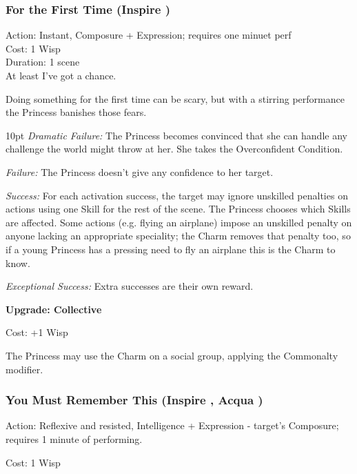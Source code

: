 \subsubsection*{For the First Time (Inspire \textbullet\textbullet)}

\noindent Action: Instant, Composure + Expression; requires one minuet perf\\

\noindent Cost: 1 Wisp\\

\noindent Duration: 1 scene\\

At least I've got a chance.

Doing something for the first time can be scary, but with a stirring performance the Princess banishes those fears. 

\begin{myindentpar}{10pt}
\emph{Dramatic Failure:} The Princess becomes convinced that she can handle any challenge the world might throw at her. She takes the Overconfident Condition.

\emph{Failure:} The Princess doesn’t give any confidence to her target.

\emph{Success:} For each activation success, the target may ignore unskilled penalties on actions using one Skill for the rest of the scene. The Princess chooses which Skills are affected. Some actions (e.g. flying an airplane) impose an unskilled penalty on anyone lacking an appropriate speciality; the Charm removes that penalty too, so if a young Princess has a pressing need to fly an airplane this is the Charm to know.

\emph{Exceptional Success:} Extra successes are their own reward.

\textbf{Upgrade: Collective}

Cost: +1 Wisp

The Princess may use the Charm on a social group, applying the Commonalty modifier.\end{myindentpar}

\subsubsection*{You Must Remember This (Inspire \textbullet\textbullet, Acqua \textbullet)}

\noindent Action: Reflexive and resisted, Intelligence + Expression - target's Composure; requires 1 minute of performing. 

\noindent Cost: 1 Wisp

